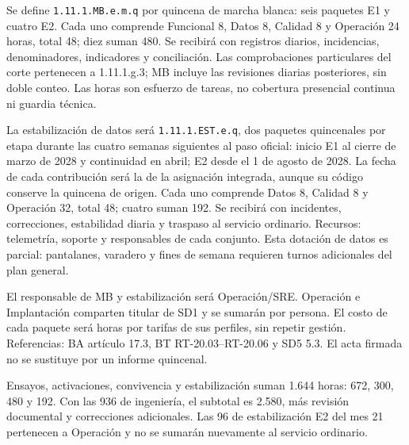 Se define \texttt{1.11.1.MB.e.m.q} por quincena de marcha blanca: seis paquetes E1 y cuatro E2. Cada uno comprende Funcional 8, Datos 8, Calidad 8 y Operación 24 horas, total 48; diez suman 480. Se recibirá con registros diarios, incidencias, denominadores, indicadores y conciliación. Las comprobaciones particulares del corte pertenecen a 1.11.1.g.3; MB incluye las revisiones diarias posteriores, sin doble conteo. Las horas son esfuerzo de tareas, no cobertura presencial continua ni guardia técnica.

La estabilización de datos será \texttt{1.11.1.EST.e.q}, dos paquetes quincenales por etapa durante las cuatro semanas siguientes al paso oficial: inicio E1 al cierre de marzo de 2028 y continuidad en abril; E2 desde el 1 de agosto de 2028. La fecha de cada contribución será la de la asignación integrada, aunque su código conserve la quincena de origen. Cada uno comprende Datos 8, Calidad 8 y Operación 32, total 48; cuatro suman 192. Se recibirá con incidentes, correcciones, estabilidad diaria y traspaso al servicio ordinario. Recursos: telemetría, soporte y responsables de cada conjunto. Esta dotación de datos es parcial: pantalanes, varadero y fines de semana requieren turnos adicionales del plan general.

El responsable de MB y estabilización será Operación/SRE. Operación e Implantación comparten titular de SD1 y se sumarán por persona. El costo de cada paquete será horas por tarifas de sus perfiles, sin repetir gestión. Referencias: BA artículo 17.3, BT RT-20.03--RT-20.06 y SD5 5.3. El acta firmada no se sustituye por un informe quincenal.

Ensayos, activaciones, convivencia y estabilización suman 1.644 horas: 672, 300, 480 y 192. Con las 936 de ingeniería, el subtotal es 2.580, más revisión documental y correcciones adicionales. Las 96 de estabilización E2 del mes 21 pertenecen a Operación y no se sumarán nuevamente al servicio ordinario.
